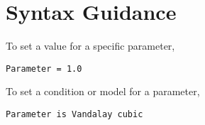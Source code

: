 

\section{Syntax Guidance}

To set a value for a specific parameter,
\begin{lstlisting}
Parameter = 1.0
\end{lstlisting}

To set a condition or model for a parameter,
\begin{lstlisting}
Parameter is Vandalay cubic
\end{lstlisting}


